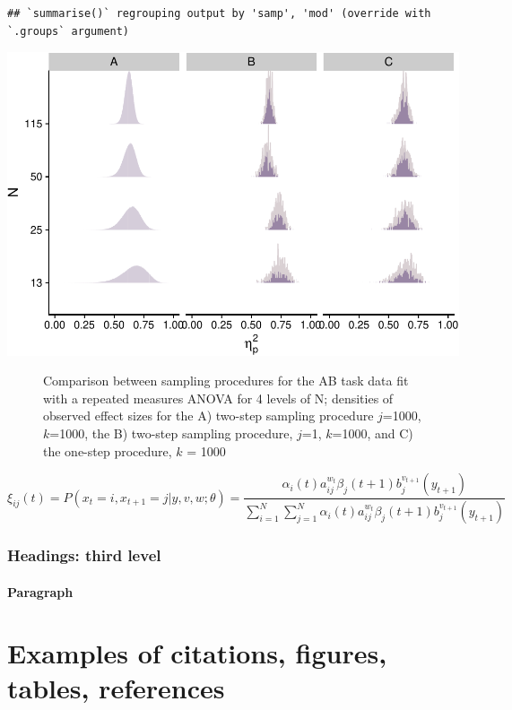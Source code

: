 \documentclass{article}
\begin{document}
\begin{verbatim}
## `summarise()` regrouping output by 'samp', 'mod' (override with `.groups` argument)
\end{verbatim}

\begin{center}\includegraphics[width=0.7\linewidth]{super-fx_files/figure-latex/supp_sampling-1} \end{center}

\begin{figure}
  \centering
  \caption{Comparison between sampling procedures for the AB task data fit with a repeated measures ANOVA for 4 levels of N; densities of observed effect sizes for the A) two-step sampling procedure $j$=1000, $k$=1000, the B) two-step sampling procedure, $j$=1, $k$=1000, and C) the one-step procedure, $k$ = 1000}
  \label{fig:samples}
\end{figure}

\[
\xi _{ij}(t)=P(x_{t}=i,x_{t+1}=j|y,v,w;\theta)= {\frac {\alpha _{i}(t)a^{w_t}_{ij}\beta _{j}(t+1)b^{v_{t+1}}_{j}(y_{t+1})}{\sum _{i=1}^{N} \sum _{j=1}^{N} \alpha _{i}(t)a^{w_t}_{ij}\beta _{j}(t+1)b^{v_{t+1}}_{j}(y_{t+1})}}
\]

\hypertarget{headings-third-level}{%
\subsubsection{Headings: third level}\label{headings-third-level}}

\lipsum[6]

\paragraph{Paragraph}
\lipsum[7]

\hypertarget{examples-of-citations-figures-tables-references}{%
\section{Examples of citations, figures, tables,
references}\label{examples-of-citations-figures-tables-references}}
\end{document}
